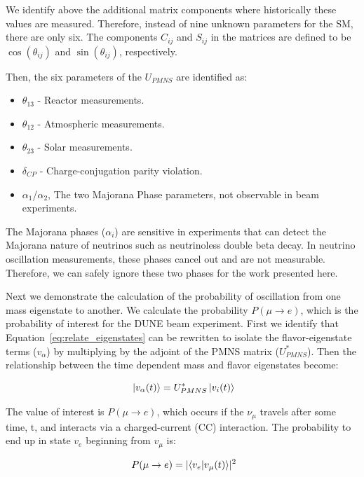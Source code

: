 We identify above the additional matrix components where historically these values are measured.
Therefore, instead of nine unknown parameters for the SM, there are only six.
The components $C_{ij}$ and $S_{ij}$ in the matrices are defined to be $\cos(\theta_{ij})$ and $\sin(\theta_{ij})$, respectively.

Then, the six parameters of the $U_{PMNS}$ are identified as:
\begin{itemize}
    \item $\theta_{13}$ - Reactor measurements.
    \item $\theta_{12}$ - Atmospheric measurements.
    \item $\theta_{23}$ - Solar measurements.
    \item $\delta_{CP}$ - Charge-conjugation parity violation.
    \item $\alpha_{1}$/$\alpha_{2}$, The two Majorana Phase parameters, not observable in beam experiments.
\end{itemize}

The Majorana phases ($\alpha_{i}$) are sensitive in experiments that can detect the Majorana nature of neutrinos such as neutrinoless double beta decay.
In neutrino oscillation measurements, these phases cancel out and are not measurable.
Therefore, we can safely ignore these two phases for the work presented here.

Next we demonstrate the calculation of the probability of oscillation from one mass eigenstate to another.
We calculate the probability $P(\mu \rightarrow e)$, which is the probability of interest for the DUNE beam experiment.
First we identify that Equation~\ref{eq:relate_eigenstates} can be rewritten to isolate the flavor-eigenstate terms ($v_{\alpha}$) by multiplying by the adjoint of the PMNS matrix ($U^{*}_{PMNS}$).
Then the relationship between the time dependent mass and flavor eigenstates become:

\begin{equation}~\label{eq:flavor_relation}
\ket{v_{\alpha}(t)} = U^{*}_{PMNS}\ket{v_{i}(t)}
\end{equation}

The value of interest is $P(\mu \rightarrow e)$, which occurs if the $\nu_{\mu}$ travels after some time, t, and interacts via a charged-current (CC) interaction.
The probability to end up in state $v_{e}$ beginning from $v_{\mu}$ is:

\begin{equation}~\label{eq:prob_calc1}
P(\mu \rightarrow e) = \lvert \braket{ v_{e} | v_{\mu} (t) }\rvert^{2}
\end{equation}

